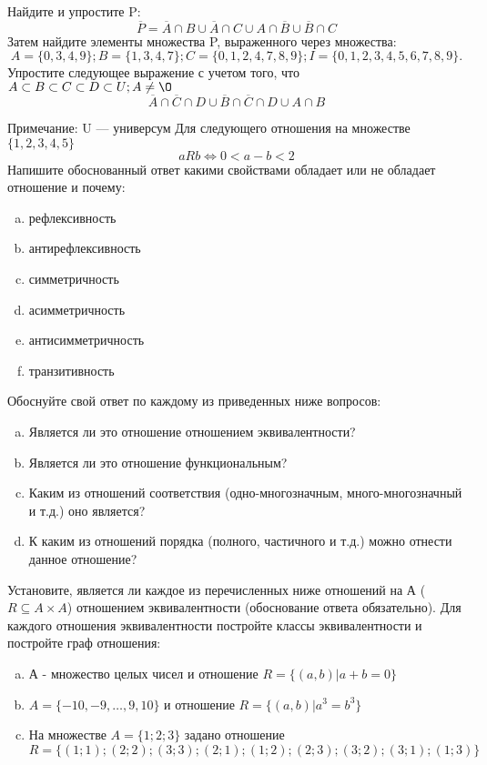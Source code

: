 \documentclass[10pt]{exam}
\begin{document}
\begin{questions}
\question
Найдите и упростите P:
\begin{equation*}
\overline{P} = \overline{A} \cap B \cup \overline{A} \cap C \cup A \cap \overline{B} \cup \overline{B} \cap C
\end{equation*}
Затем найдите элементы множества P, выраженного через множества:
\begin{equation*}
A = \{0, 3, 4, 9\}; 
B = \{1, 3, 4, 7\};
C = \{0, 1, 2, 4, 7, 8, 9\};
I = \{0, 1, 2, 3, 4, 5, 6, 7, 8, 9\}.
\end{equation*}\question
Упростите следующее выражение с учетом того, что $A\subset B \subset C \subset D \subset U; A \neq \O$
\begin{equation*}
\overline{A} \cap \overline{C} \cap D \cup \overline{B} \cap \overline{C} \cap D \cup A \cap B
\end{equation*}

Примечание: U — универсум\question
Для следующего отношения на множестве $\{1, 2, 3, 4, 5\}$ 
\begin{equation*}
aRb \iff 0 < a-b<2
\end{equation*}
Напишите обоснованный ответ какими свойствами обладает или не обладает отношение и почему:   
\begin{enumerate} [a)]\setcounter{enumi}{0}
\item рефлексивность
\item антирефлексивность
\item симметричность
\item асимметричность
\item антисимметричность
\item транзитивность
\end{enumerate}

Обоснуйте свой ответ по каждому из приведенных ниже вопросов:
\begin{enumerate} [a)]\setcounter{enumi}{0}
    \item Является ли это отношение отношением эквивалентности?
    \item Является ли это отношение функциональным?
    \item Каким из отношений соответствия (одно-многозначным, много-многозначный и т.д.) оно является?
    \item К каким из отношений порядка (полного, частичного и т.д.) можно отнести данное отношение?
\end{enumerate}
\question
Установите, является ли каждое из перечисленных ниже отношений на А ($R \subseteq A \times A$) отношением эквивалентности (обоснование ответа обязательно). Для каждого отношения эквивалентности 
постройте классы эквивалентности и постройте граф отношения:
\begin{enumerate}[a)]\setcounter{enumi}{0}
\item А - множество целых чисел и отношение $R = \{(a,b)|a + b = 0\}$
\item $A = \{-10, -9, …, 9, 10\}$ и отношение $R = \{(a,b)|a^{3} = b^{3}\}$
\item На множестве $A = \{1; 2; 3\}$ задано отношение $R = \{(1; 1); (2; 2); (3; 3); (2; 1); (1; 2); (2; 3); (3; 2); (3; 1); (1; 3)\}$


\end{enumerate}
\end{questions}
\end{document}
